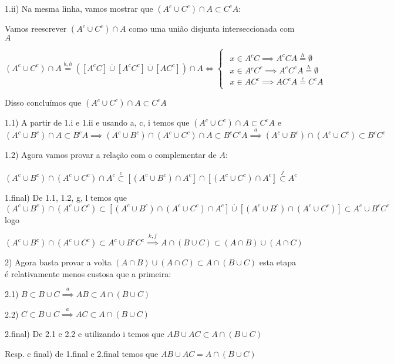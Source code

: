 \documentclass[portuguese]{article}
\begin{document}
1.ii) Na mesma linha, vamos mostrar que $(A^{c}\cup C^{c})\cap A\subset C^{c}A$:

Vamos reescrever $(A^{c}\cup C^{c})\cap A$ como uma união disjunta
interseccionada com $A$

$(A^{c}\cup C^{c})\cap A\overset{b,h}{=}([A^{c}C]\overset{.}{\cup}[A^{c}C^{c}]\overset{.}{\cup}[AC^{c}])\cap A\Longleftrightarrow\begin{cases}
\begin{array}{c}
x\in A{}^{c}C\implies A^{c}CA\overset{h}{=}\emptyset\\
x\in A{}^{c}C^{c}\implies A^{c}C^{c}A\overset{h}{=}\emptyset\\
x\in AC^{c}\implies AC^{c}A\overset{c}{=}C^{c}A
\end{array}\end{cases}$

Disso concluímos que $(A^{c}\cup C^{c})\cap A\subset C^{c}A$

1.1) A partir de 1.i e 1.ii e usando a, c, i temos que $(A^{c}\cup C^{c})\cap A\subset C^{c}A$
e $(A^{c}\cup B^{c})\cap A\subset B^{c}A\implies(A^{c}\cup B^{c})\cap(A^{c}\cup C^{c})\cap A\subset B^{c}C^{c}A\overset{a}{\implies}(A^{c}\cup B^{c})\cap(A^{c}\cup C^{c})\subset B^{c}C^{c}$

1.2) Agora vamos provar a relação com o complementar de $A$:

$(A^{c}\cup B^{c})\cap(A^{c}\cup C^{c})\cap A^{c}\overset{c}{\subset}[(A^{c}\cup B^{c})\cap A^{c}]\cap[(A^{c}\cup C^{c})\cap A^{c}]\overset{j}{\subset}A^{c}$ 

1.final) De 1.1, 1.2, g, l temos que $(A^{c}\cup B^{c})\cap(A^{c}\cup C^{c})\subset[(A^{c}\cup B^{c})\cap(A^{c}\cup C^{c})\cap A^{c}]\overset{.}{\cup}[(A^{c}\cup B^{c})\cap(A^{c}\cup C^{c})]\subset A^{c}\cup B^{c}C^{c}$
logo

$(A^{c}\cup B^{c})\cap(A^{c}\cup C^{c})\subset A^{c}\cup B^{c}C^{c}\overset{k,f}{\implies}A\cap(B\cup C)\subset(A\cap B)\cup(A\cap C)$

2) Agora basta provar a volta $(A\cap B)\cup(A\cap C)\subset A\cap(B\cup C)$
esta etapa é relativamente menos custosa que a primeira:

2.1) $B\subset B\cup C\overset{a}{\implies}AB\subset A\cap(B\cup C)$

2.2) $C\subset B\cup C\overset{a}{\implies}AC\subset A\cap(B\cup C)$

2.final) De 2.1 e 2.2 e utilizando i temos que $AB\cup AC\subset A\cap(B\cup C)$

Resp. c final) de 1.final e 2.final temos que $AB\cup AC=A\cap(B\cup C)$
\end{document}
